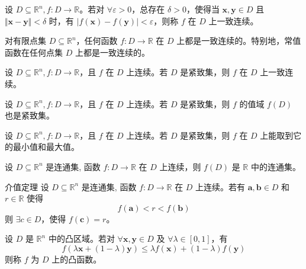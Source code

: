 \begin{definition}
    设 $D \subseteq \mathbb{R}^n, f : D \to \mathbb{R}$。若对 $\forall \varepsilon > 0$，总存在 $\delta > 0$，使得当 $\bm{x}, \bm{y} \in D$ 且 $\Vert \bm{x} - \bm{y} \Vert < \delta$ 时，有 $\vert f(\bm{x}) - f(\bm{y}) \vert < \varepsilon$，则称 $f$ 在 $D$ 上一致连续。
\end{definition}

\begin{remark}
    对有限点集 $D \subseteq \mathbb{R}^n$，任何函数 $f: D \to \mathbb{R}$ 在 $D$ 上都是一致连续的。特别地，常值函数在任何点集 $D$ 上都是一致连续的。
\end{remark}

\begin{theorem}
    设 $D \subseteq \mathbb{R}^n, f: D \to \mathbb{R}$，且 $f$ 在 $D$ 上连续。若 $D$ 是紧致集，则 $f$ 在 $D$ 上一致连续。
\end{theorem}

\begin{theorem}
    设 $D \subseteq \mathbb{R}^n, f: D \to \mathbb{R}$，且 $f$ 在 $D$ 上连续。若 $D$ 是紧致集，则 $f$ 的值域 $f(D)$ 也是紧致集。
\end{theorem}

\begin{theorem}
    设 $D \subseteq \mathbb{R}^n, f: D \to \mathbb{R}$，且 $f$ 在 $D$ 上连续。若 $D$ 是紧致集，则 $f$ 在 $D$ 上能取到它的最小值和最大值。
\end{theorem}

\begin{theorem}
    设 $D \subseteq \mathbb{R}^n$ 是连通集, 函数 $f: D \to \mathbb{R}$ 在 $D$ 上连续，则 $f(D)$ 是 $\mathbb{R}$ 中的连通集。
\end{theorem}

\begin{theorem}{介值定理}
    设 $D \subseteq \mathbb{R}^n$ 是连通集, 函数 $f: D \to \mathbb{R}$ 在 $D$ 上连续。若有 $\bm{a}, \bm{b} \in D$ 和 $r \in \mathbb{R}$ 使得
    \[
        f(\bm{a}) < r < f(\bm{b})
    \]
    则 $\exists c \in D$，使得 $f(\bm{c}) = r$。
\end{theorem}

\begin{definition}
    设 $D$ 是 $\mathbb{R}^n$ 中的凸区域。若对 $\forall \bm{x}, \bm{y} \in D$ 及 $\forall \lambda \in [0, 1]$，有
    \[
        f(\lambda \bm{x} + (1 - \lambda)\bm{y}) \leqslant \lambda f(\bm{x}) + (1 - \lambda)f(\bm{y})
    \]
    则称 $f$ 为 $D$ 上的凸函数。
\end{definition}

